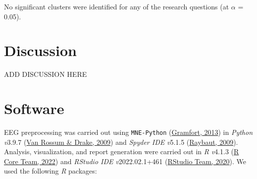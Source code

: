 \documentclass[
  man,floatsintext]{apa6}
\begin{document}
No significant clusters were identified for any of the research questions (at \(\alpha\) = 0.05).

\hypertarget{discussion}{%
\section{Discussion}\label{discussion}}

ADD DISCUSSION HERE

\hypertarget{software}{%
\section{Software}\label{software}}

EEG preprocessing was carried out using \texttt{MNE-Python} (\protect\hyperlink{ref-gramfort2013}{Gramfort, 2013}) in \emph{Python} \emph{v}3.9.7 (\protect\hyperlink{ref-vanrossum-2009}{Van Rossum \& Drake, 2009}) and \emph{Spyder IDE} \emph{v}5.1.5 (\protect\hyperlink{ref-raybaut2009}{Raybaut, 2009}). Analysis, visualization, and report generation were carried out in \emph{R} \emph{v}4.1.3 (\protect\hyperlink{ref-R-base}{R Core Team, 2022}) and \emph{RStudio IDE} \emph{v}2022.02.1+461 (\protect\hyperlink{ref-R-studio}{RStudio Team, 2020}). We used the following \emph{R} packages:
\end{document}
